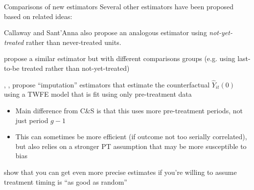 \documentclass[aspectratio = 169, 13pt]{beamer}
\begin{document}
\begin{frame}{Comparisons of new estimators}
  Several other estimators have been proposed based on related ideas:

  \begin{wideitemize}
    \item
    Callaway and Sant'Anna also propose an analogous estimator using \textit{not-yet-treated} rather than never-treated units.

    \item
    \citet{sun_estimating_2020} propose a similar estimator but with different comparisons groups (e.g. using last-to-be treated rather than not-yet-treated)

    \item
    \citet{borusyak_revisiting_2021}, \citet{Wooldridge2021a}, \citet{gardner_two-stage_2021} propose ``imputation'' estimators that estimate the counterfactual $\hat{Y}_{it}(0)$ using a TWFE model that is fit using only pre-treatment data
    \begin{itemize}
      \item
            Main difference from C\&S is that this uses more pre-treatment periods, not just period $g-1$

      \item
            This can sometimes be more efficient (if outcome not too serially correlated), but also relies on a stronger PT assumption that may be more susceptible to bias
    \end{itemize}

    \item \citet{roth_efficient_2021} show that you can get even more precise estimates if you're willing to assume treatment timing is ``as good as random''

  \end{wideitemize}
\end{frame}
\end{document}
